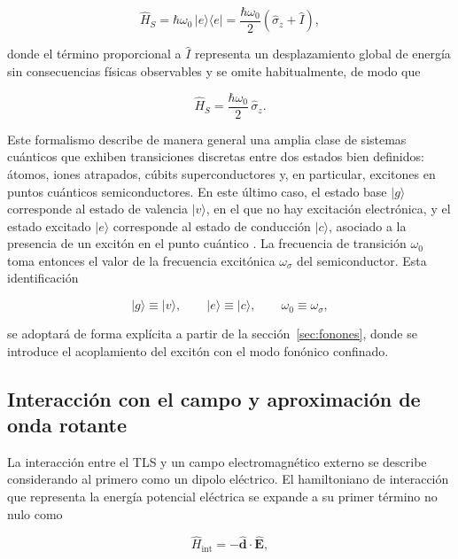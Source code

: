 \begin{equation}
	\hat{H}_S = \hbar\omega_0\,|e\rangle\langle e|
	= \frac{\hbar\omega_0}{2}\left(\hat{\sigma}_z + \hat{I}\right),
	\label{eq:HS}
\end{equation}

donde el término proporcional a $\hat{I}$ representa un desplazamiento global de energía sin consecuencias físicas observables y se omite habitualmente, de modo que

\begin{equation}
	\hat{H}_S = \frac{\hbar\omega_0}{2}\,\hat{\sigma}_z.
	\label{eq:HS_final}
\end{equation}

Este formalismo describe de manera general una amplia clase de sistemas cuánticos que exhiben transiciones discretas entre dos estados bien definidos: átomos, iones atrapados, cúbits superconductores y, en particular, excitones en puntos cuánticos semiconductores. En este último caso, el estado base $|g\rangle$ corresponde al estado de valencia $|v\rangle$, en el que no hay excitación electrónica, y el estado excitado $|e\rangle$ corresponde al estado de conducción $|c\rangle$, asociado a la presencia de un excitón en el punto cuántico \cite{fox2006}. La frecuencia de transición $\omega_0$ toma entonces el valor de la frecuencia excitónica $\omega_\sigma$ del semiconductor. Esta identificación

\begin{equation}
	|g\rangle \equiv |v\rangle, \qquad
	|e\rangle \equiv |c\rangle, \qquad
	\omega_0 \equiv \omega_\sigma,
	\label{eq:mapeo}
\end{equation}

se adoptará de forma explícita a partir de la sección~\ref{sec:fonones}, donde se introduce el acoplamiento del excitón con el modo fonónico confinado.

\subsection{Interacción con el campo y aproximación de onda rotante}
\label{sec:rwa}

La interacción entre el TLS y un campo electromagnético externo se describe considerando al primero como un dipolo eléctrico. El hamiltoniano de interacción que representa la energía potencial eléctrica se expande a su primer término no nulo como

\begin{equation}
	\hat{H}_\text{int} = -\hat{\mathbf{d}}\cdot\hat{\mathbf{E}},
	\label{eq:Hint_dipolo}
\end{equation}

